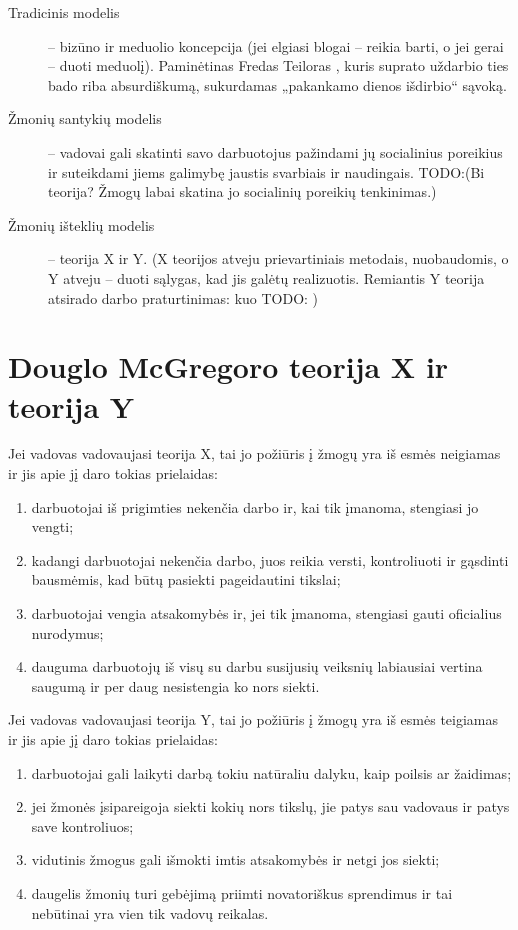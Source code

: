\begin{description}
  \item[Tradicinis modelis] – bizūno ir meduolio koncepcija (jei elgiasi
    blogai – reikia barti, o jei gerai – duoti meduolį). Paminėtinas
    Fredas Teiloras , kuris suprato uždarbio
    ties bado riba absurdiškumą, sukurdamas „pakankamo dienos
    išdirbio“ sąvoką.
  \item[Žmonių santykių modelis] – vadovai gali skatinti savo darbuotojus
    pažindami jų socialinius poreikius ir suteikdami jiems galimybę
    jaustis svarbiais ir naudingais. TODO:(Bi~ teorija? Žmogų labai skatina
    jo socialinių poreikių tenkinimas.)
  \item[Žmonių išteklių modelis] – teorija X ir Y. (X teorijos atveju
    prievartiniais metodais, nuobaudomis, o Y atveju – duoti sąlygas,
    kad jis galėtų realizuotis. Remiantis Y teorija atsirado darbo
    praturtinimas: kuo TODO: )
\end{description}

\section{Douglo McGregoro teorija X ir teorija Y}

Jei vadovas vadovaujasi teorija X, tai jo požiūris į žmogų yra iš esmės
neigiamas ir jis apie jį daro tokias prielaidas:
\begin{enumerate}
  \item darbuotojai iš prigimties nekenčia darbo ir, kai tik įmanoma,
    stengiasi jo vengti;
  \item kadangi darbuotojai nekenčia darbo, juos reikia versti,
    kontroliuoti ir gąsdinti bausmėmis, kad būtų pasiekti pageidautini
    tikslai;
  \item darbuotojai vengia atsakomybės ir, jei tik įmanoma, stengiasi
    gauti oficialius nurodymus;
  \item dauguma darbuotojų iš visų su darbu susijusių veiksnių labiausiai
    vertina saugumą ir per daug nesistengia ko nors siekti.
\end{enumerate}

Jei vadovas vadovaujasi teorija Y, tai jo požiūris į žmogų yra iš
esmės teigiamas ir jis apie jį daro tokias prielaidas:
\begin{enumerate}
  \item darbuotojai gali laikyti darbą tokiu natūraliu dalyku, kaip
    poilsis ar žaidimas;
  \item jei žmonės įsipareigoja siekti kokių nors tikslų, jie patys
    sau vadovaus ir patys save kontroliuos;
  \item vidutinis žmogus gali išmokti imtis atsakomybės ir netgi
    jos siekti;
  \item daugelis žmonių turi gebėjimą priimti novatoriškus sprendimus
    ir tai nebūtinai yra vien tik vadovų reikalas.
\end{enumerate}

